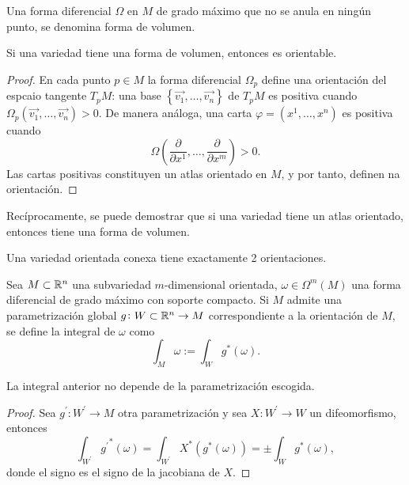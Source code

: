 \begin{defi}
    Una forma diferencial $\Omega$ en $M$ de grado máximo que no se anula en ningún punto, se denomina forma de volumen.
\end{defi}

\begin{prop*}
    Si una variedad tiene una forma de volumen, entonces es orientable.
\end{prop*}

\begin{proof}
    En cada punto $p \in M$ la forma diferencial $\Omega_p$ define una orientación del espcaio tangente $T_pM$:
    una base $\left\{ \vec{v_1}, \dots, \vec{v_n} \right\}$ de $T_pM$ es positiva cuando
    $\Omega_p\left( \vec{v_1}, \dots, \vec{v_n} \right) > 0$. De manera análoga, una carta $\varphi = \left( x^1, \dots, x^n \right)$
    es positiva cuando
    \[
        \Omega\left( \frac{\partial}{\partial x^1}, \dots, \frac{\partial}{\partial x^m} \right) > 0.
    \]
    Las cartas positivas constituyen un atlas orientado en $M$, y por tanto, definen na orientación.
\end{proof}

\begin{obs*}
    Recíprocamente, se puede demostrar que si una variedad tiene un atlas orientado, entonces tiene una forma de volumen.
\end{obs*}

\begin{obs}
    Una variedad orientada conexa tiene exactamente 2 orientaciones.
\end{obs}

\begin{defi}
    Sea $M \subset \mathbb{R}^n$ una subvariedad $m$-dimensional orientada, $\omega \in \Omega^m\left( M \right)$ una forma diferencial
    de grado máximo con soporte compacto. Si $M$ admite una parametrización global $g \colon W \subset \mathbb{R}^n \to M$ correspondiente
    a la orientación de $M$, se define la integral de $\omega$ como
    \[
        \int_M \omega := \int_W g^\ast(\omega).
    \]
\end{defi}

\begin{lema*}
    La integral anterior no depende de la parametrización escogida.
\end{lema*}

\begin{proof}
    Sea $g^\prime \colon W^\prime \to M$ otra parametrización y sea $X \colon W^\prime \to W$ un difeomorfismo, entonces
    \[
        \int_{W^\prime} {g^\prime}^\ast(\omega) = \int_{W^\prime} X^\ast\left( g^\ast(\omega) \right) = \pm \int_W g^\ast(\omega),
    \]
    donde el signo es el signo de la jacobiana de $X$.
\end{proof}


